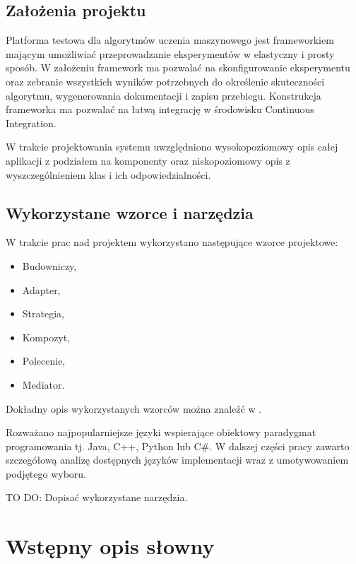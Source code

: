 \documentclass[12pt]{article}
\begin{document}
\subsection{Założenia projektu}

Platforma testowa dla algorytmów uczenia maszynowego jest frameworkiem mającym umożliwiać przeprowadzanie eksperymentów w elastyczny i prosty sposób. W założeniu framework ma pozwalać na skonfigurowanie eksperymentu oraz zebranie wszystkich wyników potrzebnych do określenie skuteczności algorytmu, wygenerowania dokumentacji i zapisu przebiegu. Konstrukcja frameworka ma pozwalać na łatwą integrację w środowisku Continuous Integration.

W trakcie projektowania systemu uwzględniono wysokopoziomowy opis całej aplikacji z podziałem na komponenty oraz niskopoziomowy opis z wyszczególnieniem klas i ich odpowiedzialności.

\subsection{Wykorzystane wzorce i narzędzia}

W trakcie prac nad projektem wykorzystano następujące wzorce projektowe:

\begin{itemize}
	\item Budowniczy,
	\item Adapter,
	\item Strategia,
	\item Kompozyt,
	\item Polecenie,
	\item Mediator.
\end{itemize}

Dokładny opis wykorzystanych wzorców można znaleźć w \cite{gang-of-four}.

Rozważano najpopularniejsze języki wspierające obiektowy paradygmat programowania tj. Java, C++, Python lub C\#. W dalszej części pracy zawarto szczegółową analizę dostępnych języków implementacji wraz z umotywowaniem podjętego wyboru.

TO DO: Dopisać wykorzystane narzędzia.


\section{Wstępny opis słowny}
\end{document}
